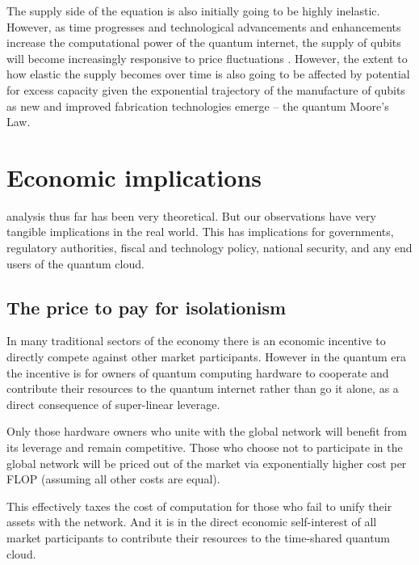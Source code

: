 The supply side of the equation is also initially going to be highly inelastic. However, as time progresses and technological advancements and enhancements increase the computational power of the quantum internet, the supply of qubits will become increasingly responsive to price fluctuations . However, the extent to how elastic the supply becomes over time is also going to be affected by potential for excess capacity given the exponential trajectory of the manufacture of qubits as new and improved fabrication technologies emerge -- the quantum Moore's Law.

%
%

\section{Economic implications}

 analysis thus far has been very theoretical. But our observations have very tangible implications in the real world. This has implications for governments, regulatory authorities, fiscal and technology policy, national security, and any end users of the quantum cloud.

%
%

\subsection{The price to pay for isolationism}

In many traditional sectors of the economy there is an economic incentive to directly compete against other market participants. However in the quantum era the incentive is for owners of quantum computing hardware to cooperate and contribute their resources to the quantum internet rather than go it alone, as a direct consequence of super-linear leverage.

Only those hardware owners who unite with the global network will benefit from its leverage and remain competitive. Those who choose not to participate in the global network will be priced out of the market via exponentially higher cost per FLOP (assuming all other costs are equal).

This effectively taxes the cost of computation for those who fail to unify their assets with the network. And it is in the direct economic self-interest of all market participants to contribute their resources to the time-shared quantum cloud.

